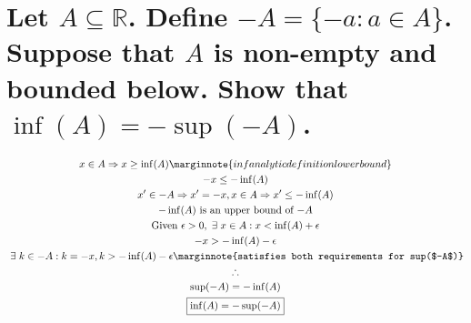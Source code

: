 \documentclass[letterpaper]{article}
\begin{document}
\section{Let $A \subseteq \mathbb{R}$. Define $-A=\{-a:a\in A\}$. Suppose that $A$ is non-empty and bounded below. Show that
$\inf(A)=-\sup(-A)$.}
\begin{gather*}
x \in A \Rightarrow x \geq \inf(A) \marginnote{inf analytic definition lower bound} \\
-x\leq-\inf(A) \\
x'\in -A \Rightarrow x'=-x,x\in A \Rightarrow x' \leq-\inf(A) \\
-\inf(A) \text{ is an upper bound of $-A$} \\ 
\text{Given } \epsilon>0,\hspace{3pt}\exists\hspace{3pt}x\in A:x<\inf(A)+\epsilon \\
-x > -\inf(A) - \epsilon \\
\hspace{3pt}\exists\hspace{3pt}k\in -A:k=-x,k>-\inf(A)-\epsilon \marginnote{satisfies both requirements for sup($-A$)} \\
\therefore \\
\sup(-A)=-\inf(A) \\
\boxed{\inf(A)=-\sup(-A)}
\end{gather*}
\end{document}

